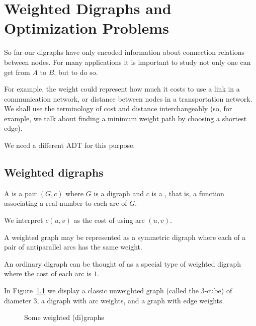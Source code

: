 \chapter{Weighted Digraphs and Optimization Problems}
\label{ch:weighted}

So far our digraphs have only encoded information about connection
relations between nodes. For many applications it is important to study
not only  one can get from $A$ to $B$, but
 to do so.

For example, the weight could represent how much it costs to use a link
in a communication network, or distance between nodes in a
transportation network. We shall use the terminology of cost and distance
interchangeably (so, for example, we talk about finding a minimum weight
path by choosing a shortest edge).

We need a different ADT for this purpose. 

\section{Weighted digraphs}
\label{sec:weighted}

\begin{Definition}
A  is a pair $(G, c)$ where $G$ is a digraph
and $c$ is a , that is, a function associating a
real number to each arc of $G$.

\end{Definition}

\begin{note} 

We interpret $c(u, v)$ as the cost of using arc $(u, v)$. 

A weighted graph may be represented as a symmetric digraph where each
of a pair of antiparallel arcs has the same weight.

An ordinary digraph can be thought of as a special type of weighted
digraph where the cost of each arc is $1$.

\end{note}


In Figure~\ref{fig:graphExample5} we display a classic unweighted graph
(called the $3$-cube) of diameter $3$, a digraph with arc weights, and a
graph with edge weights.

\begin{figure}

\label{fig:graphExample5}

\centerline{}

\caption{Some weighted (di)graphs}

\end{figure}

